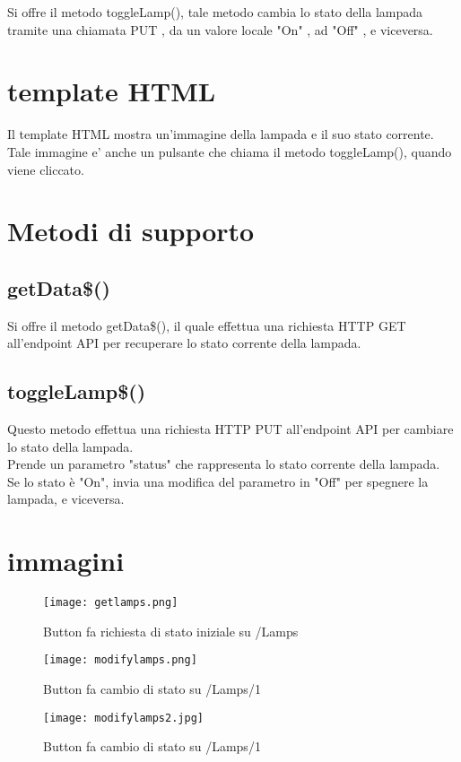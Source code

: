Si offre il metodo toggleLamp(), tale metodo cambia lo stato della lampada tramite una chiamata PUT , da un valore locale "On" , ad "Off" , e viceversa.

\section{template HTML}
Il template HTML mostra un'immagine della lampada e il suo stato corrente. \\
Tale immagine e' anche un pulsante che chiama il metodo toggleLamp(), quando viene cliccato.

\section{Metodi di supporto}

\subsection{getData\$()}
Si offre il metodo getData\$(), il quale effettua una richiesta HTTP GET all'endpoint API per recuperare lo stato corrente della lampada.

\subsection{toggleLamp\$()}
Questo metodo effettua una richiesta HTTP PUT all'endpoint API per cambiare lo stato della lampada. \\
Prende un parametro "status" che rappresenta lo stato corrente della lampada. \\
Se lo stato è "On", invia una modifica del parametro in "Off" per spegnere la lampada, e viceversa.

\section{immagini}

\begin{figure}[H]
    \centering
    \texttt{[image: getlamps.png]}
    \caption{Button fa richiesta di stato iniziale su /Lamps}
\end{figure}


\begin{figure}[H]
    \centering
    \texttt{[image: modifylamps.png]}
    \caption{Button fa cambio di stato su /Lamps/1}
\end{figure}

\begin{figure}[H]
    \centering
    \texttt{[image: modifylamps2.jpg]}
    \caption{Button fa cambio di stato su /Lamps/1}
\end{figure}
